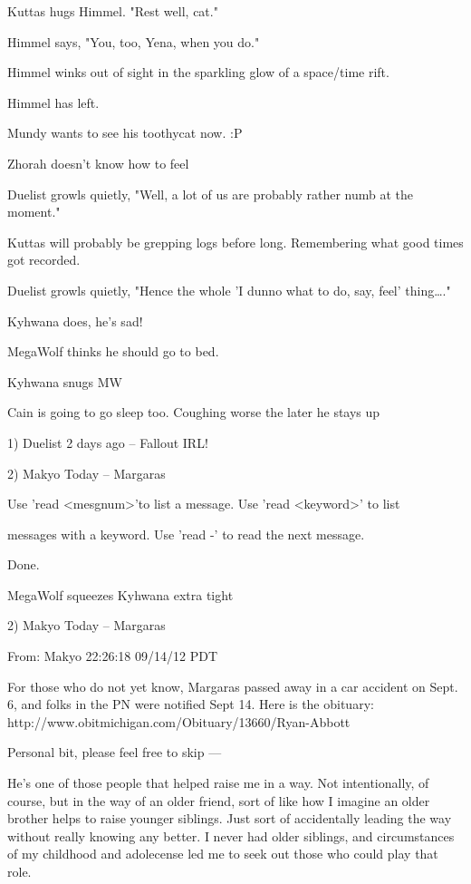 \begin{hangparas}{2em}{1}
Kuttas hugs Himmel. "Rest well, cat."

Himmel says, "You, too, Yena, when you do."

Himmel winks out of sight in the sparkling glow of a space/time rift.

Himmel has left.

Mundy wants to see his toothycat now. :P

Zhorah doesn't know how to feel

Duelist growls quietly, "Well, a lot of us are probably rather numb at the moment."

Kuttas will probably be grepping logs before long. Remembering what good times got recorded.

Duelist growls quietly, "Hence the whole 'I dunno what to do, say, feel' thing\ldots{}."

Kyhwana does, he's sad!

MegaWolf thinks he should go to bed.

Kyhwana snugs MW

Cain is going to go sleep too. Coughing worse the later he stays up

1) Duelist  2 days ago -- Fallout IRL!

2) Makyo  Today -- Margaras

Use 'read <mesgnum>'to list a message.  Use 'read <keyword>' to list

messages with a keyword.  Use 'read -' to read the next message.

Done.

MegaWolf squeezes Kyhwana extra tight

2) Makyo  Today -- Margaras

From: Makyo  22:26:18 09/14/12 PDT

\noindent For those who do not yet know, Margaras passed away in a car accident on Sept. 6, and folks in the PN were notified Sept 14.  Here is the obituary: http://www.obitmichigan.com/Obituary/13660/Ryan-Abbott

Personal bit, please feel free to skip ---

He's one of those people that helped raise me in a way.  Not intentionally, of course, but in the way of an older friend, sort of like how I imagine an older brother helps to raise younger siblings.  Just sort of accidentally leading the way without really knowing any better.  I never had older siblings, and circumstances of my childhood and adolecense led me to seek out those who could play that role.


\end{hangparas}

